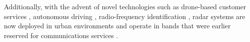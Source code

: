 \documentclass[10pt,journal]{IEEEtran}
\theoremstyle{definition}
\begin{document}
Additionally, with the advent of novel technologies such as drone-based customer services \cite{alaee2019radar}, autonomous driving \cite{mishra2019remcw}, radio-frequency identification \cite{sedighi2019localization,sedighi2020localization}, radar systems are now deployed in urban environments and operate in bands that were earlier reserved for communications services \cite{elbir2019joint}. %
\fi
\end{document}
